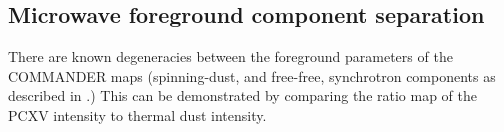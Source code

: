 
          \subsection{Microwave foreground component separation}

            There are known degeneracies between the foreground parameters of the COMMANDER maps (spinning-dust, and free-free, synchrotron components as described in \cite{planck15X}.) This can be demonstrated by comparing the ratio map of the PCXV intensity to thermal dust intensity.
